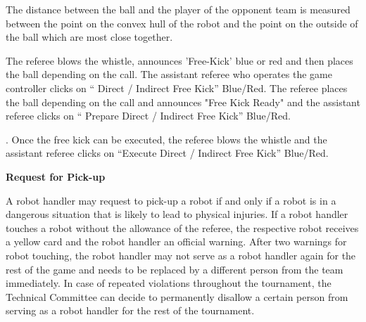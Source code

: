 The distance between the ball and the player of the opponent team is measured between the point on the convex hull of the robot and the point on the outside of the ball which are most close together.

\color{black}


The referee blows the whistle, announces 'Free-Kick' blue or red and then places the ball depending on the call. The assistant referee who operates the game controller clicks on `` Direct / Indirect Free Kick'' Blue/Red. The referee places the ball depending on the call and announces "Free Kick Ready" and the assistant referee clicks on `` Prepare Direct / Indirect Free Kick'' Blue/Red. 

. Once the free kick can be executed, the referee blows the whistle and the assistant referee clicks on ``Execute Direct / Indirect Free Kick'' Blue/Red. 


\bigskip


{\bfseries Request for Pick-up}

A robot handler may request to pick-up a robot if and only if a robot is in a dangerous situation that is likely to lead to physical injuries. If a robot handler touches a robot without the allowance of the referee, the respective robot receives a yellow card and the robot handler an official warning.  After two warnings for robot touching, the robot handler may not serve as a robot handler again for the rest of the game and needs to be replaced by a different person from the team immediately. In case of repeated violations throughout the tournament, the Technical Committee can decide to permanently disallow a certain person from serving as a robot handler for the rest of the tournament.

